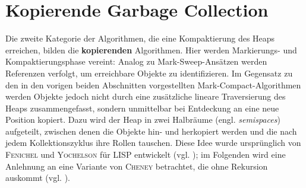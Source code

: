 \section{Kopierende Garbage Collection}
\label{sec:copying}
Die zweite Kategorie der Algorithmen, die eine Kompaktierung des Heaps erreichen, bilden die \textbf{kopierenden} Algorithmen.
Hier werden Markierungs- und Kompaktierungsphase vereint:
Analog zu Mark-Sweep-Ansätzen werden Referenzen verfolgt, um erreichbare Objekte zu identifizieren.
Im Gegensatz zu den in den vorigen beiden Abschnitten vorgestellten Mark-Compact-Algorithmen werden Objekte jedoch nicht durch eine zusätzliche lineare Traversierung des Heaps zusammengefasst, sondern unmittelbar bei Entdeckung an eine neue Position kopiert.
Dazu wird der Heap in zwei Halbräume (engl. \textit{semispaces}) aufgeteilt, zwischen denen die Objekte hin- und herkopiert werden und die nach jedem Kollektionszyklus ihre Rollen tauschen.
Diese Idee wurde ursprünglich von \textsc{Fenichel} und \textsc{Yochelson} für LISP entwickelt (vgl. \cite{fenichel1969}); im Folgenden wird eine Anlehnung an eine Variante von \textsc{Cheney} betrachtet, die ohne Rekursion auskommt (vgl. \cite{cheney1970}).

